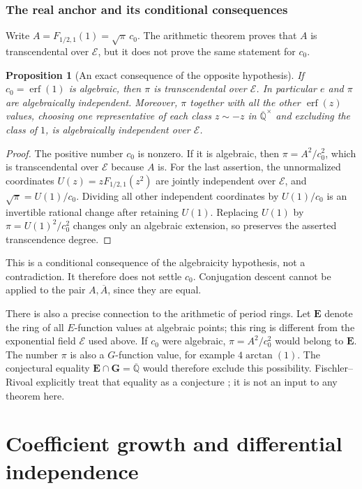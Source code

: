 \documentclass[11pt,a4paper]{article}
\newcommand{\Qbar}{\overline{\mathbb Q}}
\newcommand{\E}{\mathcal E}
\DeclareMathOperator{\erf}{erf}
\newtheorem{proposition}[theorem]{Proposition}
\theoremstyle{definition}
\theoremstyle{remark}
\numberwithin{equation}{section}
\begin{document}
\section{The real anchor and its conditional consequences}

Write $A=F_{1/2,1}(1)=\sqrt\pi\,c_0$. The arithmetic theorem proves
that $A$ is transcendental over $\E$, but it does not prove the same
statement for $c_0$.

\begin{proposition}[An exact consequence of the opposite hypothesis]\label{norm:prop:real-anchor-hypothesis}
If $c_0=\erf(1)$ is algebraic, then $\pi$ is transcendental over
$\E$. In particular $e$ and $\pi$ are algebraically independent.
Moreover, $\pi$ together with all the other $\erf(z)$ values, choosing
one representative of each class $z\sim-z$ in $\Qbar^\times$
and excluding the class of $1$, is algebraically independent over $\E$.
\end{proposition}
\begin{proof}
The positive number $c_0$ is nonzero. If it is algebraic, then
$\pi=A^2/c_0^2$, which is transcendental over $\E$ because $A$ is.
For the last assertion, the unnormalized coordinates
$U(z)=zF_{1/2,1}(z^2)$ are jointly independent over $\E$, and
$\sqrt\pi=U(1)/c_0$. Dividing all other independent coordinates by
$U(1)/c_0$ is an invertible rational change after retaining $U(1)$.
Replacing $U(1)$ by $\pi=U(1)^2/c_0^2$ changes only an algebraic
extension, so preserves the asserted transcendence degree.
\end{proof}

This is a conditional consequence of the algebraicity hypothesis,
not a contradiction. It therefore does not settle $c_0$.
Conjugation descent cannot be applied to the pair $A,\overline A$,
since they are equal.

There is also a precise connection to the arithmetic of period rings.
Let $\mathbf E$ denote the ring of all $E$-function values at algebraic
points; this ring is different from the exponential field $\E$ used
above. If $c_0$ were algebraic, $\pi=A^2/c_0^2$ would belong to
$\mathbf E$. The number $\pi$ is also a $G$-function value, for example
$4\arctan(1)$. The conjectural equality
$\mathbf E\cap\mathbf G=\Qbar$ would therefore exclude this
possibility. Fischler--Rivoal explicitly treat that equality as a
conjecture \cite{FischlerRivoal}; it is not an input to any theorem here.



\clearpage
\part{Coefficient growth and differential independence}\label{part:differential}
\end{document}
